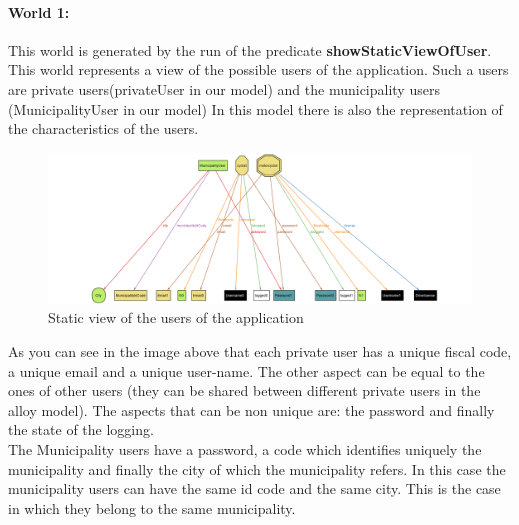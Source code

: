 \documentclass[titlepage]{article}
\begin{document}
\paragraph{World 1: \\}
This world is generated by the run of the  predicate \textbf{showStaticViewOfUser}. This world represents a view of the possible users of the application. Such a users are private users(privateUser in our model) and the municipality users (MunicipalityUser in our model) In this model there is also the representation of the characteristics of the users.
\newpage
\begin{figure}[h]
	\includegraphics[scale=0.66, angle=90]{Alloy images/staticViewUsers.png}
	\centering
	\caption{Static view of the users of the application}
\end{figure}
\FloatBarrier
As you can see in the image above that each private user has a unique fiscal code, a unique email and a unique user-name. The other aspect can be equal to the ones of other users (they can be shared between different private users in the alloy model). The aspects that can be non unique are: the password and finally the state of the logging.\\
The Municipality users have a password, a code which identifies uniquely the municipality and finally the city of which the municipality refers. In this case the municipality users can have the same id code and the same city. This is the case in which they belong to the same municipality.
\end{document}
